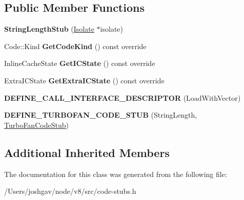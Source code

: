 \subsection*{Public Member Functions}
\begin{DoxyCompactItemize}
\item 
{\bfseries String\+Length\+Stub} (\hyperlink{classv8_1_1internal_1_1_isolate}{Isolate} $\ast$isolate)\hypertarget{classv8_1_1internal_1_1_string_length_stub_a3ef5cc106b81d62eb1633796380f45b9}{}\label{classv8_1_1internal_1_1_string_length_stub_a3ef5cc106b81d62eb1633796380f45b9}

\item 
Code\+::\+Kind {\bfseries Get\+Code\+Kind} () const  override\hypertarget{classv8_1_1internal_1_1_string_length_stub_adcc48a0c2627dbcb1e43e539a6422fe1}{}\label{classv8_1_1internal_1_1_string_length_stub_adcc48a0c2627dbcb1e43e539a6422fe1}

\item 
Inline\+Cache\+State {\bfseries Get\+I\+C\+State} () const  override\hypertarget{classv8_1_1internal_1_1_string_length_stub_a6f38ad497f5bbc589bb1d5d258d2e868}{}\label{classv8_1_1internal_1_1_string_length_stub_a6f38ad497f5bbc589bb1d5d258d2e868}

\item 
Extra\+I\+C\+State {\bfseries Get\+Extra\+I\+C\+State} () const  override\hypertarget{classv8_1_1internal_1_1_string_length_stub_a96fc7124b5a86d8f0378a3810a51efd6}{}\label{classv8_1_1internal_1_1_string_length_stub_a96fc7124b5a86d8f0378a3810a51efd6}

\item 
{\bfseries D\+E\+F\+I\+N\+E\+\_\+\+C\+A\+L\+L\+\_\+\+I\+N\+T\+E\+R\+F\+A\+C\+E\+\_\+\+D\+E\+S\+C\+R\+I\+P\+T\+OR} (Load\+With\+Vector)\hypertarget{classv8_1_1internal_1_1_string_length_stub_a505539e5bdca2eb32b4e9f4ef7f4e2c5}{}\label{classv8_1_1internal_1_1_string_length_stub_a505539e5bdca2eb32b4e9f4ef7f4e2c5}

\item 
{\bfseries D\+E\+F\+I\+N\+E\+\_\+\+T\+U\+R\+B\+O\+F\+A\+N\+\_\+\+C\+O\+D\+E\+\_\+\+S\+T\+UB} (String\+Length, \hyperlink{classv8_1_1internal_1_1_turbo_fan_code_stub}{Turbo\+Fan\+Code\+Stub})\hypertarget{classv8_1_1internal_1_1_string_length_stub_a8473fda5129e64f93238854be9373fb7}{}\label{classv8_1_1internal_1_1_string_length_stub_a8473fda5129e64f93238854be9373fb7}

\end{DoxyCompactItemize}
\subsection*{Additional Inherited Members}


The documentation for this class was generated from the following file\+:\begin{DoxyCompactItemize}
\item 
/\+Users/joshgav/node/v8/src/code-\/stubs.\+h\end{DoxyCompactItemize}
